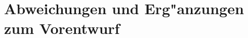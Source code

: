 \chapter[Abweichungen und Erg"anzungen zum Vorentwurf]{Abweichungen und Erg"anzungen\\zum Vorentwurf}
\label{Abweichungen}

